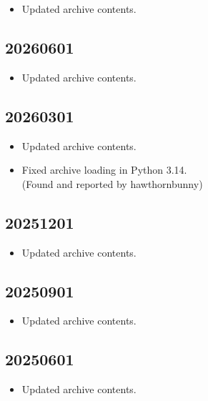 \documentclass[hidelinks,a4paper,12pt]{article}
\begin{document}
\begin{itemize}
\item Updated archive contents.
\end{itemize}

\subsection{20260601}  \label{sec:changelog_20260601}

\begin{itemize}
\item Updated archive contents.
\end{itemize}

\subsection{20260301}  \label{sec:changelog_20260301}

\begin{itemize}
\item Updated archive contents.
\item Fixed archive loading in Python 3.14.
  \\ (Found and reported by hawthornbunny)
\end{itemize}

\subsection{20251201}  \label{sec:changelog_20251201}

\begin{itemize}
\item Updated archive contents.
\end{itemize}

\subsection{20250901}  \label{sec:changelog_20250901}

\begin{itemize}
\item Updated archive contents.
\end{itemize}

\subsection{20250601}  \label{sec:changelog_20250601}

\begin{itemize}
\item Updated archive contents.
\end{itemize}
\end{document}
